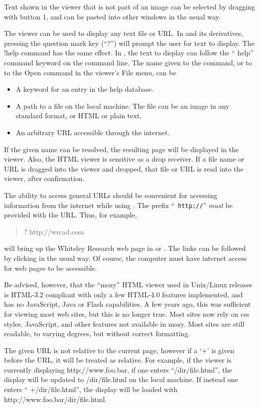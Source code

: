 Text shown in the viewer that is not part of an image can be selected
by dragging with button 1, and can be pasted into other windows in the
usual way.

The viewer can be used to display any text file or URL.  In {\Xic} and
its derivatives, pressing the question mark key (``{\kb ?}'') will
prompt the user for text to display.  The {\cb !help} command has the
same effect.  In {\WRspice}, the text to display can follow the ``{\cb
help}'' command keyword on the command line.  The name given to the
command, or to to the {\cb Open} command in the viewer's {\cb File}
menu, can be
\begin{itemize}
\item{A keyword for an entry in the help database.}
\item{A path to a file on the local machine.  The file can be an image
in any standard format, or HTML or plain text.}
\item{An arbitrary URL accessible through the internet.}
\end{itemize}

If the given name can be resolved, the resulting page will be
displayed in the viewer.  Also, the HTML viewer is sensitive as a drop
receiver.  If a file name or URL is dragged into the viewer and
dropped, that file or URL is read into the viewer, after confirmation.

The ability to access general URLs should be convenient for accessing
information from the internet while using {\Xic}.  The prefix ``{\tt
http://}'' {\it must} be provided with the URL.  Thus,
for example,
\begin{quote}\vt
? http://wrcad.com
\end{quote}
will bring up the Whiteley Research web page in {\Xic} or {\WRspice}. 
The links can be followed by clicking in the usual way.  Of course,
the computer must have internet access for web pages to be accessible.

Be advised, however, that the ``{\vt mozy}'' HTML viewer used in
Unix/Linux releases is HTML-3.2 compliant with only a few HTML-4.0
features implemented, and has no JavaScript, Java or Flash
capabilities.  A few years ago, this was sufficient for viewing most
web sites, but this is no longer true.  Most sites now rely on css
styles, JavaScript, and other features not available in {\vt mozy}. 
Most sites are still readable, to varying degrees, but without correct
formatting.

The given URL is not relative to the current page, however if a `+' is
given before the URL, it will be treated as relative.  For example, if
the viewer is currently displaying {\vt http://www.foo.bar}, if one
enters ``{\vt /dir/file.html}'', the display will be updated to {\vt
/dir/file.html} on the local machine.  If instead one enters ``{\vt
+/dir/file.html}'', the display will be loaded with {\vt
http://www.foo.bar/dir/file.html}.


